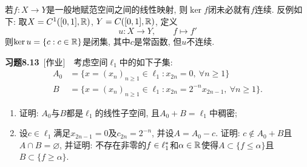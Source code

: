 	\begin{Remark}
	若$ f : X\to Y $是一般地赋范空间之间的线性映射, 则$ \ker f $闭未必就有$ f $连续. 反例如下: 取$ X=C^1([0,1],\mathbb{R}) $, $ Y=C([0,1],\mathbb{R}) $, 定义
	\[
	u : X\to Y ,\qquad f\mapsto f'
	\]
	则$ \ker u=\{ c : c\in\mathbb{R} \} $是闭集, 其中$ c $是常函数, 但$ u $不连续.
	\end{Remark}

	\textbf{习题8.13}\ [作业]\ \ 考虑空间$ \ell_1 $中的如下子集:
	\[
	\begin{aligned}
	A_0&=\{ x=(x_n)_{n\geqslant 1}\in\ell_1 : x_{2n}=0,\ \forall n\geqslant 1 \}\\
	B&=\{ x=(x_n)_{n\geqslant 1}\in\ell_1 : x_{2n}=2^{-n}x_{2n-1},\ \forall n\geqslant 1 \}.
	\end{aligned}
	\]
	\begin{enumerate}[(1)]
	\item 证明: $ A_0 $与$ B $都是$ \ell_1 $的线性子空间, 且$ A_0+B=\ell_1 $中稠密;
	\item 设$ c\in\ell_1 $满足$ x_{2n-1}=0 $及$ c_{2n}=2^{-n} $, 并设$ A=A_0-c $. 证明: $ c\notin A_0+B $且$ A\cap B=\varnothing $, 并证明: 不存在非零的$ f\in\ell_1^{*} $和$ \alpha\in\mathbb{R} $使得$ A\subset\{ f\leqslant\alpha \} $且$ B\subset\{ f\geqslant\alpha \} $.
	\end{enumerate}
